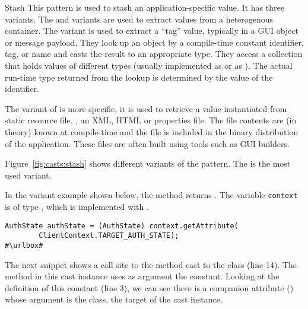 \begin{pattern}{Stash}
This pattern is used to stash an application-specific value.
It has three variants.
The  and  variants are used to extract values from a heterogenous container.
The  variant is used to extract a ``tag'' value, 
typically in a GUI object or message payload.
They look up an object by a compile-time constant identifier, tag, or name and casts the result to an appropriate type.
They access a collection that holds values of different types
(usually implemented as  or as ).
The actual run-time type returned from the lookup is determined by the value of the identifier.

The  variant of is more specific,
it is used to retrieve a value instantiated from static resource file,
\eg, an XML, HTML or \java{} properties file.
The file contents are (in theory) known at compile-time and the file is included in the binary distribution of the application.
These files are often built using tools such as GUI builders.

\instances{}
Figure~\ref{fig:casts:stash} shows different variants of the pattern.
The  is the most used variant.


In the  variant example shown below,
the  method returns .
The variable \texttt{context} is of type ,
which is implemented with .

\def\urlvar{http://bit.ly/loopj_android_async_http_2SUzY4E}
\begin{verbatim}
AuthState authState = (AuthState) context.getAttribute(
        ClientContext.TARGET_AUTH_STATE);
#\urlbox#
\end{verbatim}

The next snippet shows a call site to the  method cast to the  class (line 14).
The  method in this cast instance uses as argument the  constant.
Looking at the definition of this constant (line 3),
we can see there is a companion attribute () whose argument is the  class, the target of the cast instance.


\end{pattern}
